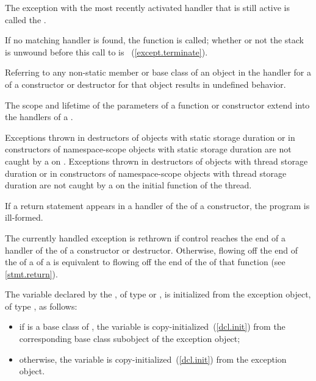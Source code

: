 \pnum
The exception with the most recently activated handler that is
still active is called the
.

\pnum
If no matching handler is found,
the function
is called;
whether or not the stack is unwound before this call to
is ~(\ref{except.terminate}).

\pnum
Referring to any non-static member or base class of an object
in the handler for a
of a constructor or destructor for that object results in undefined behavior.

\pnum
The scope and lifetime of the parameters of a function or constructor
extend into the handlers of a
.

\pnum
Exceptions thrown in destructors of objects with static storage duration or in
constructors of namespace-scope objects with static storage duration are not caught by a
on
. Exceptions thrown in destructors of objects with thread storage duration or in constructors of namespace-scope objects with thread storage duration are not caught by a
on the initial function of the thread.

\pnum
If a return statement appears in a handler of the
of a
constructor, the program is ill-formed.

\pnum
The currently handled exception
is rethrown if control reaches the end of a handler of the
of a constructor or destructor.
Otherwise, flowing off the end of
the 
of a 
of a 
is equivalent to flowing off the end of
the 
of that function (see \ref{stmt.return}).

\pnum
The variable declared by the , of type
\cv{}  or \cv{} , is initialized from the exception object,
of type , as follows:

\begin{itemize}
\item
if  is a base class of , the variable is
copy-initialized~(\ref{dcl.init}) from the corresponding base class subobject
of the exception object;
\item otherwise, the variable is copy-initialized~(\ref{dcl.init})
from the exception object.
\end{itemize}

